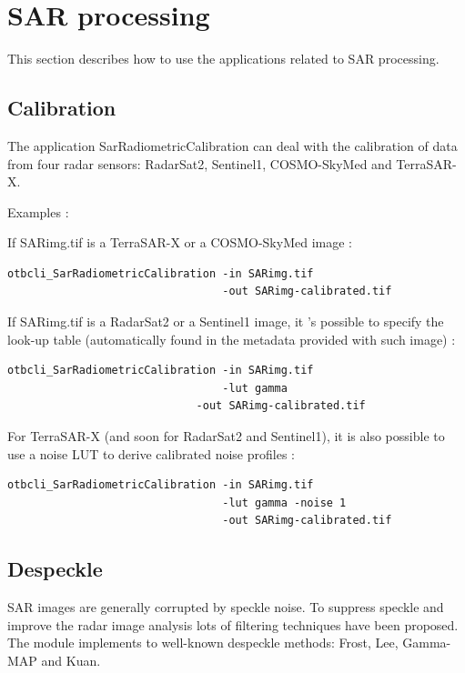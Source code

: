 \newpage
\section{SAR processing}

This section describes how to use the applications related to SAR processing.

\subsection{Calibration}

The application SarRadiometricCalibration can deal with the calibration of data from four radar sensors:
RadarSat2, Sentinel1, COSMO-SkyMed and TerraSAR-X.

Examples :

If SARimg.tif is a TerraSAR-X or a COSMO-SkyMed image :

\begin{verbatim} 
otbcli_SarRadiometricCalibration -in SARimg.tif 
                                 -out SARimg-calibrated.tif 
\end{verbatim}
									  
If SARimg.tif is a RadarSat2 or a Sentinel1 image, it 's possible to specify the look-up table 
(automatically found in the metadata provided with such image) :

\begin{verbatim} 
otbcli_SarRadiometricCalibration -in SARimg.tif 
                                 -lut gamma
	                         -out SARimg-calibrated.tif 
\end{verbatim}

For TerraSAR-X (and soon for RadarSat2 and Sentinel1), it is also possible
to use a noise LUT to derive calibrated noise profiles :

\begin{verbatim} 
otbcli_SarRadiometricCalibration -in SARimg.tif 
                                 -lut gamma -noise 1
                                 -out SARimg-calibrated.tif 
\end{verbatim}

\subsection{Despeckle}
SAR images are generally corrupted by speckle noise. To suppress speckle and
improve the radar image analysis lots of filtering techniques have been
proposed.  The module implements to well-known despeckle methods: Frost, Lee,
Gamma-MAP and Kuan.

